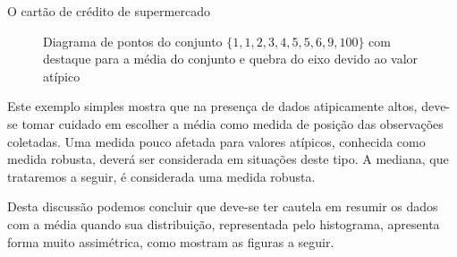 \begin{example}{O cartão de crédito de supermercado}
\begin{figure}[H]
\centering
\capstart

\caption{Diagrama de pontos do conjunto \(\{1, 1, 2, 3, 4, 5, 5, 6, 9, 100\}\) com destaque para a média do conjunto e quebra do eixo devido ao valor atípico}\label{\detokenize{PE104-1:fig-diagramadepontos-media-com-outlier}}\label{\detokenize{PE104-1:id13}}\end{figure}

Este exemplo simples mostra que na presença de dados atipicamente altos, deve-se tomar cuidado em escolher a média como medida de posição das observações coletadas. Uma medida pouco afetada para valores atípicos, conhecida como medida robusta,  deverá ser considerada em situações deste tipo. A mediana, que trataremos a seguir, é considerada uma medida robusta.

\end{example}

Desta discussão podemos concluir que deve-se ter cautela em resumir os dados com a média quando sua distribuição, representada pelo histograma, apresenta forma muito assimétrica, como mostram as figuras a seguir.

